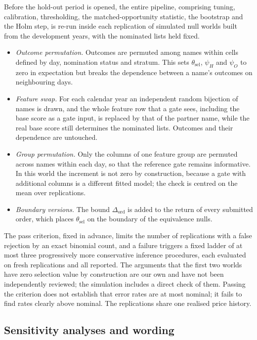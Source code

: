\documentclass[11pt]{article}
\theoremstyle{remark}
\newcommand{\thetasel}{\theta_{\mathrm{sel}}}
\begin{document}
Before the hold-out period is opened, the entire pipeline, comprising tuning, calibration,
thresholding, the matched-opportunity statistic, the bootstrap and the Holm step, is re-run
inside each replication of simulated null worlds built from the development years, with the
nominated lists held fixed.
\begin{itemize}
\item \emph{Outcome permutation.} Outcomes are permuted among names within cells defined by day,
nomination status and stratum. This sets $\thetasel$, $\psi_H$ and $\psi_O$ to zero in
expectation but breaks the dependence between a name's outcomes on neighbouring days.
\item \emph{Feature swap.} For each calendar year an independent random bijection of names is
drawn, and the whole feature row that a gate sees, including the base score as a gate input, is
replaced by that of the partner name, while the real base score still determines the nominated
lists. Outcomes and their dependence are untouched.
\item \emph{Group permutation.} Only the columns of one feature group are permuted across names
within each day, so that the reference gate remains informative. In this world the increment is
not zero by construction, because a gate with additional columns is a different fitted model;
the check is centred on the mean over replications.
\item \emph{Boundary versions.} The bound $\Delta_{\mathrm{ord}}$ is added to the return of
every submitted order, which places $\thetasel$ on the boundary of the equivalence nulls.
\end{itemize}
The pass criterion, fixed in advance, limits the number of replications with a false rejection
by an exact binomial count, and a failure triggers a fixed ladder of at most three
progressively more conservative inference procedures, each evaluated on fresh replications and
all reported. The arguments that the first two worlds have zero selection value by construction
are our own and have not been independently reviewed; the simulation includes a direct check of
them. Passing the criterion does not establish that error rates are at most nominal; it fails to
find rates clearly above nominal. The replications share one realised price history.

\subsection{Sensitivity analyses and wording}
\label{sec:wording}
\end{document}
